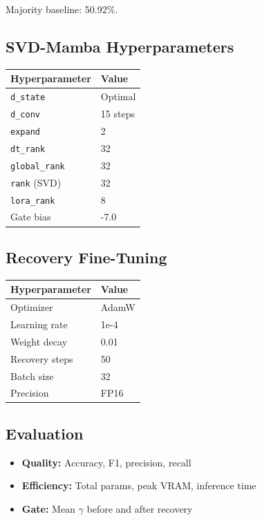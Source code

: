 Majority baseline: 50.92\%.

\subsection{SVD-Mamba Hyperparameters}

\begin{table}[H]
\centering
\small
\begin{tabular}{ll}
\toprule
\textbf{Hyperparameter} & \textbf{Value} \\
\midrule
\texttt{d\_state} & Optimal \\
\texttt{d\_conv} & 15 steps \\
\texttt{expand} & 2 \\
\texttt{dt\_rank} & 32 \\
\texttt{global\_rank} & 32 \\
\texttt{rank} (SVD) & 32 \\
\texttt{lora\_rank} & 8 \\
Gate bias & -7.0 \\
\bottomrule
\end{tabular}
\end{table}

\subsection{Recovery Fine-Tuning}

\begin{table}[H]
\centering
\small
\begin{tabular}{ll}
\toprule
\textbf{Hyperparameter} & \textbf{Value} \\
\midrule
Optimizer & AdamW \\
Learning rate & 1e-4 \\
Weight decay & 0.01 \\
Recovery steps & 50 \\
Batch size & 32 \\
Precision & FP16 \\
\bottomrule
\end{tabular}
\end{table}

\subsection{Evaluation}

\begin{itemize}
\item \textbf{Quality:} Accuracy, F1, precision, recall
\item \textbf{Efficiency:} Total params, peak VRAM, inference time
\item \textbf{Gate:} Mean $\gamma$ before and after recovery

\end{itemize}
